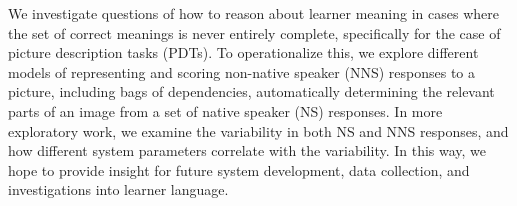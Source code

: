 We investigate questions of how to reason about learner meaning in cases where the set of correct meanings is never entirely complete, specifically for the case of picture description tasks (PDTs). To operationalize this, we explore different models of representing and scoring non-native speaker (NNS) responses to a picture, including bags of dependencies, automatically determining the relevant parts of an image from a set of native speaker (NS) responses. In more exploratory work, we examine the variability in both NS and NNS responses, and how different system parameters correlate with the variability. In this way, we hope to provide insight for future system development, data collection, and investigations into learner language.

